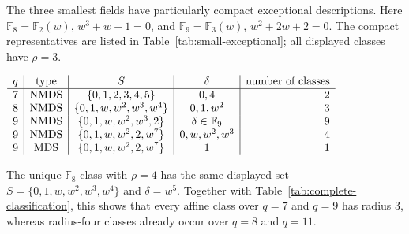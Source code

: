 \documentclass[11pt]{article}
\newcommand{\F}{\mathbb F}
\theoremstyle{plain}
\theoremstyle{definition}
\begin{document}
The three smallest fields have particularly compact exceptional
descriptions.  Here \(\F_8=\F_2(w)\), \(w^3+w+1=0\), and
\(\F_9=\F_3(w)\), \(w^2+2w+2=0\).  The compact representatives are listed
in Table~\ref{tab:small-exceptional}; all displayed classes have \(\rho=3\).
\begin{center}
\label{tab:small-exceptional}
\(
\begin{array}{c|c|c|c|r}
q & \hbox{type} & S & \delta & \hbox{number of classes}\\
\hline
7 & \mathrm{NMDS} & \{0,1,2,3,4,5\} & 0,4 & 2\\
8 & \mathrm{NMDS} & \{0,1,w,w^2,w^3,w^4\} & 0,1,w^2 & 3\\
9 & \mathrm{NMDS} & \{0,1,w,w^2,w^3,2\} & \delta\in\F_9 & 9\\
9 & \mathrm{NMDS} & \{0,1,w,w^2,2,w^7\} & 0,w,w^2,w^3 & 4\\
9 & \mathrm{MDS} & \{0,1,w,w^2,2,w^7\} & 1 & 1
\end{array}
\)
\end{center}
The unique \(\F_8\) class with \(\rho=4\) has the same displayed set
\(S=\{0,1,w,w^2,w^3,w^4\}\) and \(\delta=w^5\).
Together with Table~\ref{tab:complete-classification}, this shows that
every affine class over \(q=7\) and \(q=9\) has radius \(3\), whereas
radius-four classes already occur over \(q=8\) and \(q=11\).
\end{document}

